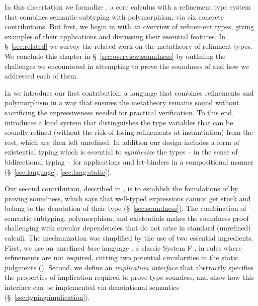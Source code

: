 In this dissertation we formalize \sysrf, a core calculus
with a refinement type system that combines semantic
subtyping with polymorphism, via six concrete contributions.
%
But first, we begin in  with an overview 
of refinement types, giving examples of their applications
and discussing their essential features. 
%
In \S~\ref{sec:related} we survey the     
related work on the metatheory of 
refinment types.
%
We conclude this
chapter in \S~\ref{sec:overview:soundness}          %
by outlining the challenges we encountered in attempting to
prove the soundness of \sysrf and how we addressed each of them.

%
In  we introduce            %
our first contribution: a language
that combines refinements and polymorphism
in a way that ensures the metatheory remains sound
without sacrificing the expressiveness needed
for practical verification.
%
To this end, \sysrf introduces a kind
system that distinguishes the type
variables that can be soundly refined
(without the risk of losing refinements
at instantiation) from the rest,
which are then left unrefined.
%
In addition our design includes
a form of existential typing \cite{Knowles09}
which is essential to \emph{synthesize} the types
-- in the sense of bidirectional typing -- for applications
and let-binders in a compositional manner 
(\S~\ref{sec:language}, \ref{sec:lang:static}).             %

%
Our second contribution,
described in ,
is to establish the foundations
of \sysrf by proving soundness,
which says that well-typed expressions cannot get stuck
and belong to the denotation of their type 
(\S~\ref{sec:soundness}).                                   %
%
%
The combination of semantic subtyping, polymorphism,
and existentials makes the soundness proof challenging
with circular dependencies that do not arise in standard
(unrefined) calculi.
%
The mechanization was simplified by the use of
two essential ingredients.
%
First, we use an unrefined \emph{base} language
\sysf, a classic System F \cite{TAPL}, in rules
where refinements are not required, cutting two potential
circularities in the static judgments ().
Second, we define an \emph{implication interface}
that abstractly specifies the properties of implication
required to prove type soundess, and show how this interface
can be implemented via denotational semantics 
(\S~\ref{sec:typing:implication}).                          %

